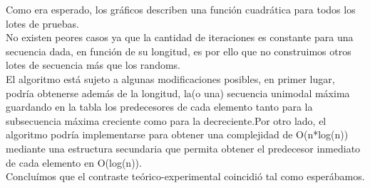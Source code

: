 Como era esperado, los gráficos describen una función cuadrática para todos los lotes de pruebas.\\
No existen peores casos ya que la cantidad de iteraciones es constante para una secuencia dada, en función de su longitud, es por ello que no construimos otros lotes de secuencia más que los randoms.\\
El algoritmo está sujeto a algunas modificaciones posibles, en primer lugar, podría obtenerse además de la longitud, la(o una) secuencia unimodal máxima guardando en la tabla los predecesores de cada elemento tanto para la subsecuencia máxima creciente como para la decreciente.Por otro lado, el algoritmo podría implementarse para obtener una complejidad de O(n*log(n)) mediante una estructura secundaria que permita obtener el predecesor inmediato de cada elemento en O(log(n)).\\
Concluímos que el contraste teórico-experimental coincidió tal como esperábamos. 